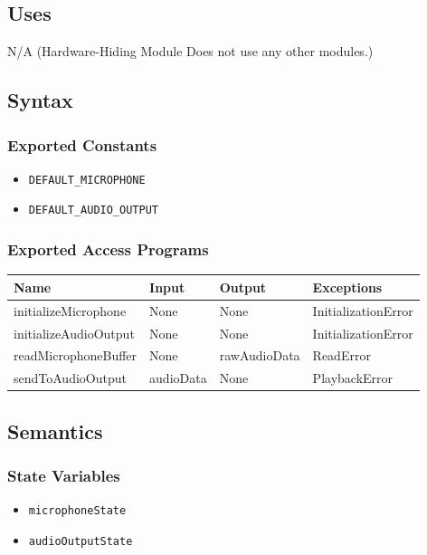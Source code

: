 \documentclass[12pt, titlepage]{article}
\begin{document}
\subsection{Uses}  
N/A (Hardware-Hiding Module Does not use any other modules.)

\subsection{Syntax}  

\subsubsection{Exported Constants}  
\begin{itemize}
    \item \texttt{DEFAULT\_MICROPHONE}  
    \item \texttt{DEFAULT\_AUDIO\_OUTPUT}  
\end{itemize}  

\subsubsection{Exported Access Programs}  
\begin{center}  
\begin{tabular}{|p{5cm}|p{2cm}|p{4cm}|p{3.5cm}|}  
\hline  
\textbf{Name} & \textbf{Input} & \textbf{Output} & \textbf{Exceptions} \\  
\hline  
initializeMicrophone & None & None & InitializationError \\  
initializeAudioOutput & None & None & InitializationError \\  
readMicrophoneBuffer & None & rawAudioData & ReadError \\  
sendToAudioOutput & audioData & None & PlaybackError \\  
\hline  
\end{tabular}  
\end{center}  

\subsection{Semantics}  

\subsubsection{State Variables}  
\begin{itemize}  
    \item \texttt{microphoneState}  
    \item \texttt{audioOutputState}  
\end{itemize}  
\end{document}
